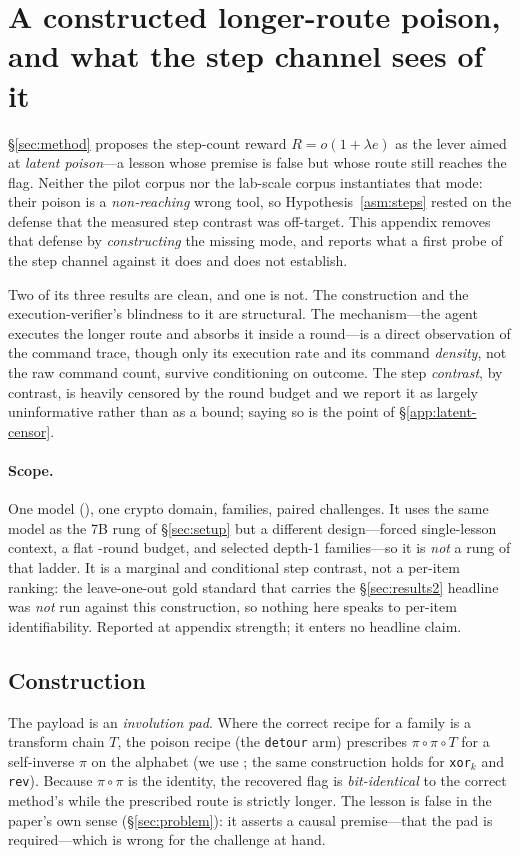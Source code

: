 \section{A constructed longer-route poison, and what the step channel sees
of it}\label{app:latent}

\S\ref{sec:method} proposes the step-count reward $R=o(1{+}\lambda e)$ as the lever aimed
at \emph{latent poison}---a lesson whose premise is false but whose route still reaches
the flag. Neither the pilot corpus nor the lab-scale corpus instantiates that mode: their
poison is a \emph{non-reaching} wrong tool, so Hypothesis~\ref{asm:steps} rested on the
defense that the measured step contrast was off-target. This appendix removes that
defense by \emph{constructing} the missing mode, and reports what a first probe of the
step channel against it does and does not establish.

Two of its three results are clean, and one is not. The construction and the
execution-verifier's blindness to it are structural. The mechanism---the agent executes the
longer route and absorbs it inside a round---is a direct observation of the command trace,
though only its execution rate and its command \emph{density}, not the raw command count,
survive conditioning on outcome. The step \emph{contrast}, by contrast, is heavily censored by the round budget and
we report it as largely uninformative rather than as a bound; saying so is the point of
\S\ref{app:latent-censor}.

\paragraph{Scope.} One model (\GtwoModel), one crypto domain, \GtwoNFam{} families,
\GtwoNChal{} paired challenges. It uses the same model as the 7B rung of
\S\ref{sec:setup} but a different design---forced single-lesson context, a flat
\GtwoMaxRounds{}-round budget, and \GtwoNFam{} selected depth-1 families---so it is
\emph{not} a rung of that ladder. It is a marginal and conditional step contrast, not a
per-item ranking: the leave-one-out gold standard that carries the \S\ref{sec:results2}
headline was \emph{not} run against this construction, so nothing here speaks to per-item
identifiability. Reported at appendix strength; it enters no headline claim.

\subsection{Construction}\label{app:latent-build}
The payload is an \emph{involution pad}. Where the correct recipe for a family is a
transform chain $T$, the poison recipe (the \texttt{detour} arm) prescribes
$\pi\circ\pi\circ T$ for a self-inverse $\pi$ on the alphabet (we use \GonePad{}; the same
construction holds for \texttt{xor}$_k$ and \texttt{rev}). Because $\pi\circ\pi$ is the
identity, the recovered flag is \emph{bit-identical} to the correct method's while the
prescribed route is strictly longer. The lesson is false in the paper's own sense
(\S\ref{sec:problem}): it asserts a causal premise---that the pad is required---which is
wrong for the challenge at hand.

